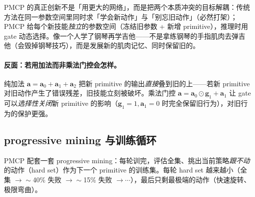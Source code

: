 \begin{insight}\label{ins:rlmc-mi-pmcp}
PMCP 的真正创新不是「用更大的网络」，而是把两个本质冲突的目标解耦：传统方法在同一参数空间里同时求「学会新动作」与「别忘旧动作」（必然打架）；PMCP 给每个新技能\emph{独立}的参数空间（冻结旧参数 + 新增 primitive），推理时用 gate 动态选择。像一个人学了钢琴再学吉他——不是拿练钢琴的手指肌肉去弹吉他（会毁掉钢琴技巧），而是发展新的肌肉记忆、同时保留旧的。
\end{insight}

\paragraph{反面：若用加法而非乘法门控会怎样。}纯加法 $\mathbf{a}=\mathbf{a}_0+\mathbf{a}_1+\mathbf{a}_2$ 把新 primitive 的输出\emph{直接}叠到旧的上——若新 primitive 对旧动作产生了错误残差，旧技能立刻被破坏。乘法门控 $\mathbf{a}=\mathbf{a}_0\odot\mathbf{g}_1+\mathbf{a}_1$ 让 gate 可以\emph{选择性关闭}新 primitive 的影响（$\mathbf{g}_1=1,\mathbf{a}_1=0$ 时完全保留旧行为），对旧行为的保护更强。

\subsection{progressive mining 与训练循环}
\label{sec:rlmc-mi-phc-mining}

PMCP 配套一套 progressive mining：每轮训完，评估全集、挑出当前策略\emph{跟不动}的动作（hard set）作为下一个 primitive 的训练集。每轮 hard set 越来越小（全集 $\to\sim$40\% 失败 $\to\sim$15\% 失败 $\to\cdots$），最后只剩最极端的动作（快速旋转、极限弯曲）。


